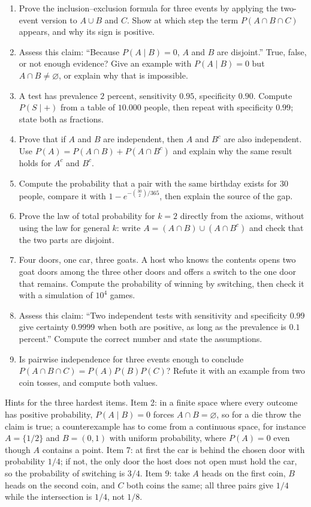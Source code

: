 \begin{latihan}
\begin{enumerate}
  \item Prove the inclusion--exclusion formula for three events by applying the two-event
        version to $A\cup B$ and $C$. Show at which step the term
        $P(A\cap B\cap C)$ appears, and why its sign is positive.
  \item Assess this claim: ``Because $P(A\mid B)=0$, $A$ and $B$ are disjoint.'' True,
        false, or not enough evidence? Give an example with $P(A\mid B)=0$ but
        $A\cap B\neq\varnothing$, or explain why that is impossible.
  \item A test has prevalence $2$ percent, sensitivity $0.95$, specificity $0.90$.
        Compute $P(S\mid+)$ from a table of $10.000$ people, then repeat with
        specificity $0.99$; state both as fractions.
  \item Prove that if $A$ and $B$ are independent, then $A$ and $B^{c}$ are also
        independent. Use $P(A)=P(A\cap B)+P(A\cap B^{c})$ and explain why
        the same result holds for $A^{c}$ and $B^{c}$.
  \item Compute the probability that a pair with the same birthday exists for $30$ people,
        compare it with $1-e^{-\binom{30}{2}/365}$, then explain the source of the gap.
  \item Prove the law of total probability for $k=2$ directly from the axioms, without using
        the law for general $k$: write $A=(A\cap B)\cup(A\cap B^{c})$ and check
        that the two parts are disjoint.
  \item Four doors, one car, three goats. A host who knows the contents opens two
        goat doors among the three other doors and offers a switch to the one door
        that remains. Compute the probability of winning by switching, then check it with a
        simulation of $10^{4}$ games.
  \item Assess this claim: ``Two independent tests with sensitivity and specificity $0.99$
        give certainty $0.9999$ when both are positive, as long as the prevalence is $0.1$
        percent.'' Compute the correct number and state the assumptions.
  \item Is pairwise independence for three events enough to conclude
        $P(A\cap B\cap C)=P(A)P(B)P(C)$? Refute it with an example from two coin tosses,
        and compute both values.
\end{enumerate}

Hints for the three hardest items. Item 2: in a finite space where every outcome has
positive probability, $P(A\mid B)=0$ forces $A\cap B=\varnothing$, so for a die throw
the claim is true; a counterexample has to come from a continuous space, for instance
$A=\{1/2\}$ and $B=(0,1)$ with uniform probability, where $P(A)=0$ even though $A$ contains
a point. Item 7: at first the car is behind the chosen door with probability $1/4$; if not,
 the only door the host does not open must hold the car, so the probability of switching is
$3/4$. Item 9: take $A$ heads on the first coin, $B$ heads on the second coin, and $C$ both
coins the same; all three pairs give $1/4$ while the intersection is $1/4$, not $1/8$.
\end{latihan}

